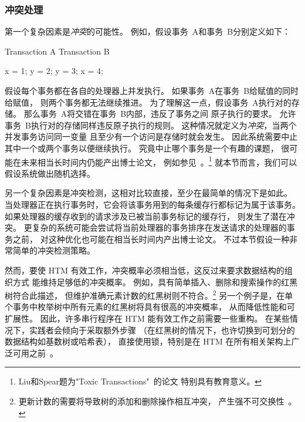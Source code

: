 \subsubsection{冲突处理}
\label{sec:future:Conflict Handling}

第一个复杂因素是\emph{冲突}的可能性。
例如，假设事务~A和事务~B分别定义如下：

\begin{VerbatimU}
Transaction A       Transaction B

x = 1;              y = 2;
y = 3;              x = 4;
\end{VerbatimU}

假设每个事务都在各自的处理器上并发执行。
如果事务~A在事务~B给赋值的同时给赋值，
则两个事务都无法继续推进。
为了理解这一点，假设事务~A执行对的存储。
那么事务~A将交错在事务~B内部，违反了事务之间
原子执行的要求。
允许事务~B执行对的存储同样违反原子执行的规则。
这种情况就定义为\emph{冲突}，当两个并发事务访问同一变量
且至少有一个访问是存储时就会发生。
因此系统需要中止其中一个或两个事务以便继续执行。
究竟中止哪个事务是一个有趣的课题，
很可能在未来相当长时间内仍能产出博士论文，
例如参见~\cite{EgeAkpinar2011HTM2TLE}。\footnote{
	Liu和Spear题为"Toxic
	Transactions"~\cite{YujieLiu2011ToxicTransactions}的论文
	特别具有教育意义。}
就本节而言，我们可以假设系统做出随机选择。

另一个复杂因素是冲突检测，这相对比较直接，至少在最简单的情况下是如此。
当处理器正在执行事务时，它会将该事务用到的每条缓存行都标记为属于该事务。
如果处理器的缓存收到的请求涉及已被当前事务标记的缓存行，
则发生了潜在冲突。
更复杂的系统可能会尝试将当前处理器的事务排序在发送请求的处理器的事务之前，
对这种优化也可能在相当长时间内产出博士论文。
不过本节假设一种非常简单的冲突检测策略。

然而，要使 HTM 有效工作，冲突概率必须相当低，这反过来要求数据结构的组织方式
能维持足够低的冲突概率。
例如，具有简单插入、删除和搜索操作的红黑树符合此描述，
但维护准确元素计数的红黑树则不符合。\footnote{
	更新计数的需要将导致树的添加和删除操作相互冲突，
	产生强不可交换性~\cite{HagitAttiya2011LawsOfOrder,Attiya:2011:LOE:1925844.1926442,PaulEMcKenney2011SNC}。}
另一个例子是，在单个事务中枚举树中所有元素的红黑树将具有很高的冲突概率，
从而降低性能和可扩展性。
因此，许多串行程序在 HTM 能有效工作之前需要一些重构。
在某些情况下，实践者会倾向于采取额外步骤
（在红黑树的情况下，也许切换到可划分的数据结构如基数树或哈希表），
直接使用锁，特别是在 HTM 在所有相关架构上广泛可用之前~\cite{CliffClick2009AzulHTM}。

\QuickQuizEnd


